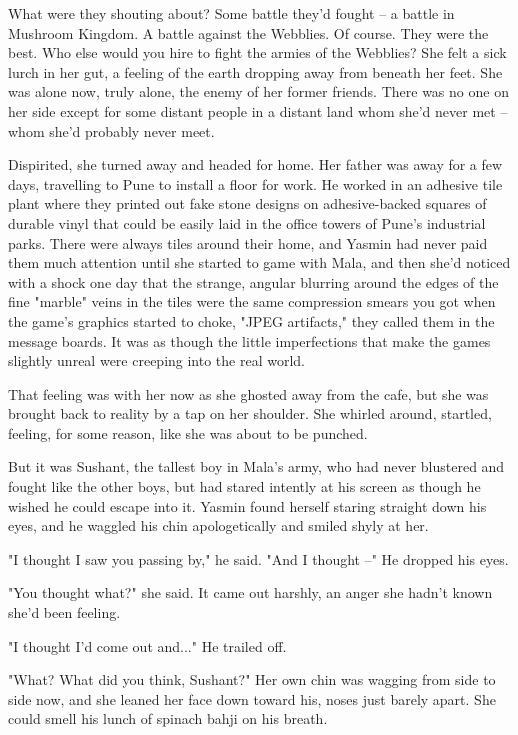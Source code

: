 What were they shouting about? Some battle they'd fought -- a
battle in Mushroom Kingdom. A battle against the Webblies. Of
course. They were the best. Who else would you hire to fight the
armies of the Webblies? She felt a sick lurch in her gut, a feeling
of the earth dropping away from beneath her feet. She was alone
now, truly alone, the enemy of her former friends. There was no one
on her side except for some distant people in a distant land whom
she'd never met -- whom she'd probably never meet.

Dispirited, she turned away and headed for home. Her father was
away for a few days, travelling to Pune to install a floor for
work. He worked in an adhesive tile plant where they printed out
fake stone designs on adhesive-backed squares of durable vinyl that
could be easily laid in the office towers of Pune's industrial
parks. There were always tiles around their home, and Yasmin had
never paid them much attention until she started to game with Mala,
and then she'd noticed with a shock one day that the strange,
angular blurring around the edges of the fine "marble" veins in the
tiles were the same compression smears you got when the game's
graphics started to choke, "JPEG artifacts," they called them in
the message boards. It was as though the little imperfections that
make the games slightly unreal were creeping into the real world.

That feeling was with her now as she ghosted away from the cafe,
but she was brought back to reality by a tap on her shoulder. She
whirled around, startled, feeling, for some reason, like she was
about to be punched.

But it was Sushant, the tallest boy in Mala's army, who had never
blustered and fought like the other boys, but had stared intently
at his screen as though he wished he could escape into it. Yasmin
found herself staring straight down his eyes, and he waggled his
chin apologetically and smiled shyly at her.

"I thought I saw you passing by," he said. "And I thought --" He
dropped his eyes.

"You thought what?" she said. It came out harshly, an anger she
hadn't known she'd been feeling.

"I thought I'd come out and..." He trailed off.

"What? What did you think, Sushant?" Her own chin was wagging from
side to side now, and she leaned her face down toward his, noses
just barely apart. She could smell his lunch of spinach bahji on
his breath.

